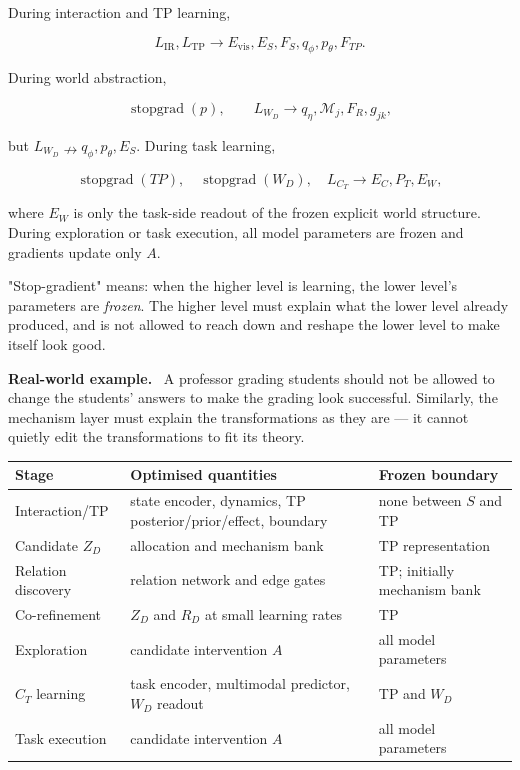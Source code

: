 \documentclass[11pt]{article}
\newenvironment{plainword}{%
  \par\medskip\noindent\begin{minipage}{\textwidth}%
  \color{gray!75!black}\small\itshape
}{%
  \end{minipage}\par\medskip}
\newenvironment{example}{%
  \par\smallskip\noindent\begin{minipage}{\textwidth}%
  \color{teal!60!black}\small
  \textbf{\color{teal!70!black}Real-world example.}\
}{%
  \end{minipage}\par\smallskip}
\begin{document}
During interaction and TP learning,

\[
L_{\mathrm{IR}},L_{\mathrm{TP}}
\rightarrow E_{\mathrm{vis}},E_S,F_S,q_\phi,p_\theta,F_{TP}.
\]

During world abstraction,

\[
\boxed{\operatorname{stopgrad}(p),\qquad
L_{W_D}\rightarrow q_\eta,\mathcal M_j,F_R,g_{jk},}
\]

but $L_{W_D}\nrightarrow q_\phi,p_\theta,E_S$. During task learning,

\[
\boxed{
\operatorname{stopgrad}(TP),\quad
\operatorname{stopgrad}(W_D),\quad
L_{C_T}\rightarrow E_C,P_T,E_W,}
\]

where $E_W$ is only the task-side readout of the frozen explicit world structure. During exploration or task execution, all model
parameters are frozen and gradients update only $A$.

\begin{plainword}
"Stop-gradient" means: when the higher level is learning, the lower level's parameters are \emph{frozen}. The higher level must
explain what the lower level already produced, and is not allowed to reach down and reshape the lower level to make itself look good.
\end{plainword}

\begin{example}
A professor grading students should not be allowed to change the students' answers to make the grading look successful. Similarly,
the mechanism layer must explain the transformations as they are --- it cannot quietly edit the transformations to fit its theory.
\end{example}

\begin{center}
\small
\begin{tabularx}{\textwidth}{@{}lXX@{}}
\toprule
Stage & Optimised quantities & Frozen boundary \\
\midrule
Interaction/TP & state encoder, dynamics, TP posterior/prior/effect, boundary & none between $S$ and TP \\
Candidate $Z_D$ & allocation and mechanism bank & TP representation \\
Relation discovery & relation network and edge gates & TP; initially mechanism bank \\
Co-refinement & $Z_D$ and $R_D$ at small learning rates & TP \\
Exploration & candidate intervention $A$ & all model parameters \\
$C_T$ learning & task encoder, multimodal predictor, $W_D$ readout & TP and $W_D$ \\
Task execution & candidate intervention $A$ & all model parameters \\
\bottomrule
\end{tabularx}
\end{center}
\end{document}
